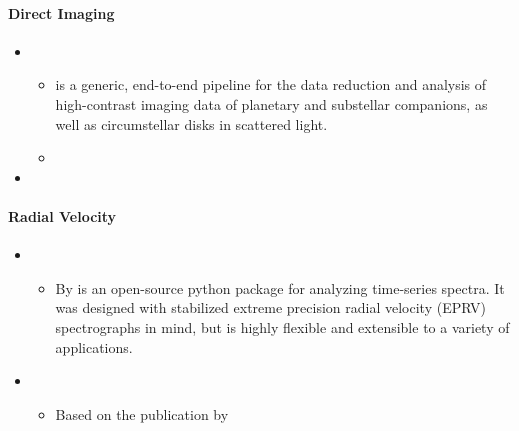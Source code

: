 \documentclass[letterpaper,10pt,english]{sphinxmanual}
\begin{document}
\paragraph{Direct Imaging}
\label{\detokenize{resource/astro/topics/exoplanet:direct-imaging}}\begin{itemize}
\item {} 
\begin{itemize}
\item {} 
 is a generic, end-to-end pipeline for the data
reduction and analysis of high-contrast imaging data of planetary
and substellar companions, as well as circumstellar disks in
scattered light.

\item {} 

\end{itemize}

\item {} 

\end{itemize}


\paragraph{Radial Velocity}
\label{\detokenize{resource/astro/topics/exoplanet:radial-velocity}}\begin{itemize}
\item {} 
\begin{itemize}
\item {} 
By   is an
open-source python package for analyzing time-series spectra. It
was designed with stabilized extreme precision radial velocity
(EPRV) spectrographs in mind, but is highly flexible and
extensible to a variety of applications.

\end{itemize}

\item {} 
\begin{itemize}
\item {} 
Based on the publication by 

\end{itemize}

\end{itemize}
\end{document}

